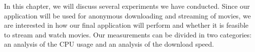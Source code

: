In this chapter, we will discuss several experiments we have conducted. Since our application will be used for anonymous downloading and streaming of movies, we are interested in how our final application will perform and whether it is feasible to stream and watch movies. Our measurements can be divided in two categories: an analysis of the CPU usage and an analysis of the download speed.